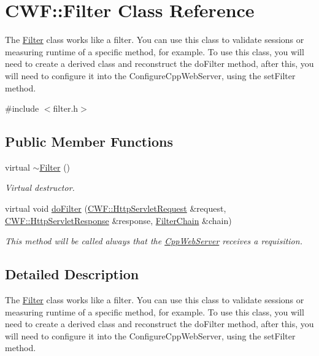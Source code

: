 \hypertarget{class_c_w_f_1_1_filter}{\section{C\+W\+F\+:\+:Filter Class Reference}
\label{class_c_w_f_1_1_filter}
}


The \hyperlink{class_c_w_f_1_1_filter}{Filter} class works like a filter. You can use this class to validate sessions or measuring runtime of a specific method, for example. To use this class, you will need to create a derived class and reconstruct the do\+Filter method, after this, you will need to configure it into the Configure\+Cpp\+Web\+Server, using the set\+Filter method.  




{\ttfamily \#include $<$filter.\+h$>$}

\subsection*{Public Member Functions}
\begin{DoxyCompactItemize}
\item 
virtual \hyperlink{class_c_w_f_1_1_filter_aa0ba072123bbcd95de94ff17d65e35aa}{$\sim$\+Filter} ()
\begin{DoxyCompactList}\small\item\em Virtual destructor. \end{DoxyCompactList}\item 
virtual void \hyperlink{class_c_w_f_1_1_filter_aa66add142c4f09a0b26f8d97a59650ba}{do\+Filter} (\hyperlink{class_c_w_f_1_1_http_servlet_request}{C\+W\+F\+::\+Http\+Servlet\+Request} \&request, \hyperlink{class_c_w_f_1_1_http_servlet_response}{C\+W\+F\+::\+Http\+Servlet\+Response} \&response, \hyperlink{class_c_w_f_1_1_filter_chain}{Filter\+Chain} \&chain)
\begin{DoxyCompactList}\small\item\em This method will be called always that the \hyperlink{class_c_w_f_1_1_cpp_web_server}{Cpp\+Web\+Server} receives a requisition. \end{DoxyCompactList}\end{DoxyCompactItemize}


\subsection{Detailed Description}
The \hyperlink{class_c_w_f_1_1_filter}{Filter} class works like a filter. You can use this class to validate sessions or measuring runtime of a specific method, for example. To use this class, you will need to create a derived class and reconstruct the do\+Filter method, after this, you will need to configure it into the Configure\+Cpp\+Web\+Server, using the set\+Filter method. 

